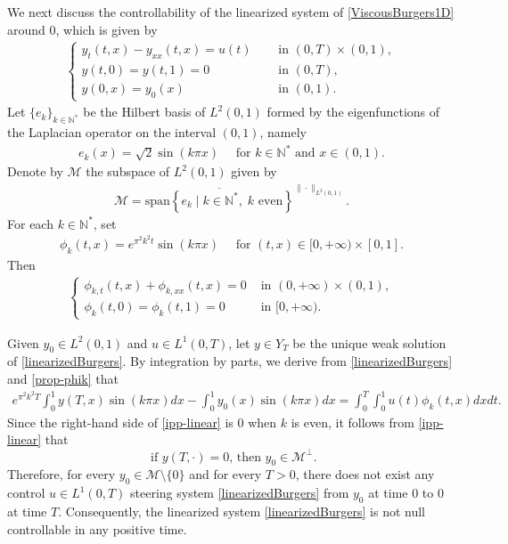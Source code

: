 \documentclass[11pt, reqno]{amsart}
\theoremstyle{plain}
\numberwithin{equation}{section}
\newcommand{\be}{\begin{equation}}
\newcommand{\ee}{\end{equation}}
\newcommand{\mN}{\mathbb{N}}
\begin{document}
We next discuss the controllability of the linearized system of \eqref{ViscousBurgers1D} around 0, which  is given by 
\begin{align}   \label{linearizedBurgers}
\begin{cases}
    y_{t} (t, x) - y_{xx} (t, x) = u(t) \quad &\text{ in } (0, T) \times (0, 1), \\[6pt]
    y(t, 0) = y(t, 1) = 0 &\text{ in } (0, T), \\[6pt]
    y(0, x) = y_0(x) & \mbox{ in } (0, 1). 
\end{cases}
\end{align}
Let $\{e_k \}_{k \in \mN^*}$ be the Hilbert basis of $L^2(0, 1)$ formed by the eigenfunctions of the Laplacian operator on the interval $(0, 1)$, namely
\begin{align} \label{def-ek}
    e_k (x) = \sqrt{2} \sin (k \pi x) \quad \mbox{ for } k \in \mN^* \text{ and } x \in (0, 1).  
\end{align}
Denote by $\mathscr{M}$ the  subspace  of $L^2(0, 1)$ given by 
\begin{align}   \label{unreachable space}
    \mathscr{M} = \overline{\mathrm{span} \left\{e_k \; | \; k \in \mathbb{N}^*, \; k  \text{ even} \right\}}^{\| \cdot \|_{L^2(0, 1)}}.
\end{align}
For each $k \in \mathbb{N}^*$, set 
\begin{align} \label{def-phik}
\phi_k(t, x) = e^{\pi^2 k^2 t} \sin(k \pi x) \quad \mbox{ for } (t, x) \in [0, + \infty) \times [0, 1]. 
\end{align}
Then 
\begin{align} \label{prop-phik}
\begin{cases}
 \phi_{k,t} (t, x) +  \phi_{k,xx} (t, x) = 0  &\mbox{ in } (0, +\infty) \times (0, 1), \\[6pt]
\phi_k (t, 0) = \phi_k(t, 1) = 0 &\mbox{ in } [0, + \infty). 
\end{cases}
\end{align}

Given $y_0 \in L^2(0, 1)$ and $u \in L^1(0, T)$, let $y \in Y_T$ be the unique weak solution of  \eqref{linearizedBurgers}. By integration by parts, we derive from \eqref{linearizedBurgers} and \eqref{prop-phik} that 
\begin{align}   \label{ipp-linear}
    e^{ \pi^2 k^2 T} \int_0^1  y(T, x)  \sin(k \pi x)  dx - \int_0^1 y_0(x)  \sin(k \pi x)  dx =  \int_0^T \int_0^1 u(t) \phi_k(t, x)  dx  dt.
\end{align}
Since the right-hand side of \eqref{ipp-linear} is 0 when $k$ is even, it follows from \eqref{ipp-linear} that 
\be
\mbox{ if $y(T, \cdot) = 0$, then  $y_0 \in \mathscr{M}^{\bot}$}.
\ee 
Therefore, for every $y_0 \in \mathscr{M} \setminus \{0\}$ and for every $T>0$, there does not exist any control $u \in L^1(0, T)$ steering system \eqref{linearizedBurgers} from $y_0$ at time $0$ to $0$ at time $T$. Consequently, the linearized system \eqref{linearizedBurgers} is not null controllable in any positive time. 
\end{document}
